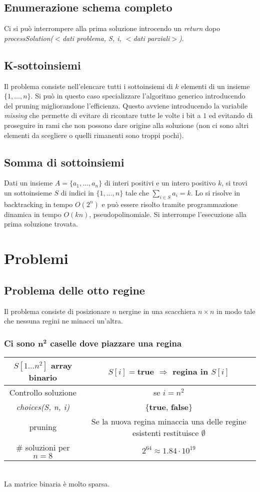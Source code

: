 \subsection{Enumerazione schema completo}

Ci si pu\`o interrompere alla prima soluzione introcendo un \emph{return} dopo \emph{processSolution($<$dati problema, S, i, $<$dati parziali$>$)}.
\subsection{K-sottoinsiemi}
Il problema consiste nell'elencare tutti i sottoinsiemi di $k$ elementi di un insieme $\{1, \dots, n\}$. Si pu\`o in questo caso specializzare l'algoritmo generico introducendo del
pruning migliorandone l'efficienza. Questo avviene introducendo la variabile \emph{missing} che permette di evitare di ricontare tutte le volte i bit a $1$ ed evitando di proseguire
in rami che non possono dare origine alla soluzione (non ci sono altri elementi da scegliere o quelli rimanenti sono troppi pochi).\\

\subsection{Somma di sottoinsiemi}
Dati un insieme $A = \{a_1, \dots, a_n\}$ di interi positivi e un intero positivo $k$, si trovi un sottoinsieme $S$ di indici in $\{1, \dots, n\}$ tale che 
$\sum\limits_{i\in S}a_i = k$. Lo si risolve in backtracking in tempo $O(2^n)$ e pu\`o essere risolto tramite programmazione dinamica in tempo $O(kn)$, pseudopolinomiale. Si interrompe
l'esecuzione alla prima soluzione trovata.\\

\section{Problemi}
\subsection{Problema delle otto regine}
Il problema consiste di posizionare $n$ nergine in una scacchiera $n\times n$ in modo tale che nessuna regini ne minacci un'altra.
\subsubsection{Ci sono $\mathbf{n^2}$ caselle dove piazzare una regina}
\begin{tabular}{|c|c|}
	\hline
	$S[1\dots n^2]$ array binario & $S[i]=$\textbf{true} $\Rightarrow$ regina in $S[i]$ \\
	\hline
	Controllo soluzione & se $i = n^2$ \\
	\hline
	\emph{choices(S, n, i)} & $\{$\textbf{true}, \textbf{false}$\}$\\
	\hline
	pruning & \makecell{Se la nuova regina minaccia una delle \\regine esistenti restituisce $\emptyset$}\\
	\hline
	$\#$ soluzioni per $n=8$ & $2^{64}\approx 1.84\cdot 10^{19}$\\
	\hline
\end{tabular}\\
La matrice binaria \`e molto sparsa.
